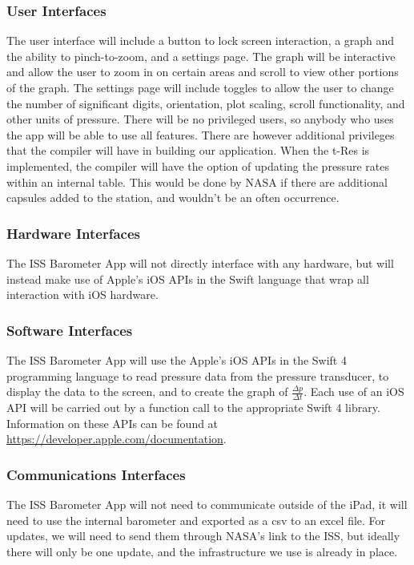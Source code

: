 \documentclass[onecolumn, draftclsnofoot,10pt, compsoc]{IEEEtran}
\def \CapstoneProjectName{ISS Barometer App }
\begin{document}
\subsubsection{User Interfaces}
The user interface will include a button to lock screen interaction, a graph and the ability to pinch-to-zoom, and a settings page.
The graph will be interactive and allow the user to zoom in on certain areas and scroll to view other portions of the graph.
The settings page will include toggles to allow the user to change the number of significant digits, orientation, plot scaling, scroll functionality, and other units of pressure.
There will be no privileged users, so anybody who uses the app will be able to use all features.
There are however additional privileges that the compiler will have in building our application.
When the t-Res is implemented, the compiler will have the option of updating the pressure rates within an internal table.
This would be done by NASA if there are additional capsules added to the station, and wouldn't be an often occurrence.

\subsubsection{Hardware Interfaces}
The \CapstoneProjectName will not directly interface with any hardware, but will instead make use of Apple's iOS APIs in the Swift language that wrap all interaction with iOS hardware.

\subsubsection{Software Interfaces}
The \CapstoneProjectName will use the Apple's iOS APIs in the Swift 4 programming language to read pressure data from the pressure transducer, to display the data to the screen, and to create the graph of $\frac{\Delta p}{\Delta t}$.
Each use of an iOS API will be carried out by a function call to the appropriate Swift 4 library. Information on these APIs can be found at \url{https://developer.apple.com/documentation}.

\subsubsection{Communications Interfaces}
The ISS Barometer App will not need to communicate outside of the iPad, it will need to use the internal barometer and exported as a csv to an excel file.
For updates, we will need to send them through NASA's link to the ISS, but ideally there will only be one update, and the infrastructure we use is already in place.
\end{document}
